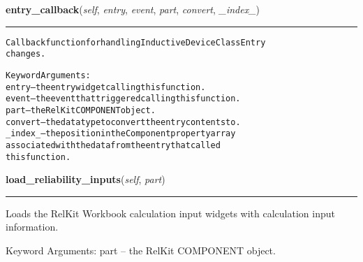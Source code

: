     \label{reliafree:resistors:resistor:Resistor:entry_callback}

    \vspace{0.5ex}

\hspace{.8\funcindent}\begin{boxedminipage}{\funcwidth}

    \raggedright \textbf{entry\_callback}(\textit{self}, \textit{entry}, \textit{event}, \textit{part}, \textit{convert}, \textit{\_index\_})

    \vspace{-1.5ex}

    \rule{\textwidth}{0.5\fboxrule}
\setlength{\parskip}{2ex}
\begin{alltt}
Callback function for handling Inductive Device Class Entry
changes.

Keyword Arguments:
  entry -- the entry widget calling this function.
  event -- the event that triggered calling this function.
   part -- the RelKit COMPONENT object.
convert -- the data type to convert the entry contents to.
\_index\_ -- the position in the Component property array
           associated with the data from the entry that called
           this function.
\end{alltt}

\setlength{\parskip}{1ex}
    \end{boxedminipage}

    \label{reliafree:resistors:resistor:Resistor:load_reliability_inputs}

    \vspace{0.5ex}

\hspace{.8\funcindent}\begin{boxedminipage}{\funcwidth}

    \raggedright \textbf{load\_reliability\_inputs}(\textit{self}, \textit{part})

    \vspace{-1.5ex}

    \rule{\textwidth}{0.5\fboxrule}
\setlength{\parskip}{2ex}
    Loads the RelKit Workbook calculation input widgets with calculation
    input information.

    Keyword Arguments: part -- the RelKit COMPONENT object.

\setlength{\parskip}{1ex}
    \end{boxedminipage}

